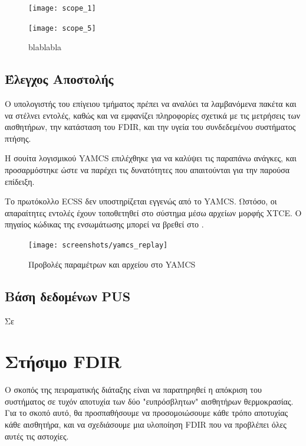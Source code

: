\documentclass[a4paper,nobib]{tufte-book}
\begin{document}
\begin{figure}[h]
	\texttt{[image: scope\_1]}
	\label{subfig:i2c_clean}
\end{figure}

\begin{figure}[h]
	\texttt{[image: scope\_5]}
	\caption{blablabla}
	\label{subfig:i2c_dirty}
\end{figure}

\FloatBarrier

\subsection{Έλεγχος Αποστολής}

Ο υπολογιστής του επίγειου τμήματος πρέπει να αναλύει τα λαμβανόμενα πακέτα και να στέλνει εντολές, καθώς και να εμφανίζει πληροφορίες σχετικά με τις μετρήσεις των αισθητήρων, την κατάσταση του \ac{FDIR}, και την υγεία του συνδεδεμένου συστήματος πτήσης.

Η σουίτα λογισμικού \acs{YAMCS} \autocite{sela_yamcs_lightweight_2012} επιλέχθηκε για να καλύψει τις παραπάνω ανάγκες, και προσαρμόστηκε ώστε να παρέχει τις δυνατότητες που απαιτούνται για την παρούσα επίδειξη.

Το πρωτόκολλο \ac{ECSS} \autocite{ECSS-E-ST-70-41C} δεν υποστηρίζεται εγγενώς από το \acs{YAMCS}. Ωστόσο, οι απαραίτητες εντολές έχουν τοποθετηθεί στο σύστημα μέσω αρχείων μορφής \ac{XTCE}.\autocite{simon_xtce_standard_2004} Ο πηγαίος κώδικας της ενσωμάτωσης μπορεί να βρεθεί στο .

\begin{figure}[h]
	\texttt{[image: screenshots/yamcs\_replay]}
	\caption{Προβολές παραμέτρων και αρχείου στο \acs{YAMCS}}
\end{figure}

\subsection{Βάση δεδομένων \acs{PUS}}

Σε


\section{Στήσιμο \ac{FDIR}}

Ο σκοπός της πειραματικής διάταξης είναι να παρατηρηθεί η απόκριση του συστήματος σε τυχόν αποτυχία των δύο "ευπρόσβλητων" αισθητήρων θερμοκρασίας. Για το σκοπό αυτό, θα προσπαθήσουμε να προσομοιώσουμε κάθε τρόπο αποτυχίας κάθε αισθητήρα, και να σχεδιάσουμε μια υλοποίηση \ac{FDIR} που να προβλέπει όλες αυτές τις αστοχίες.
\end{document}
